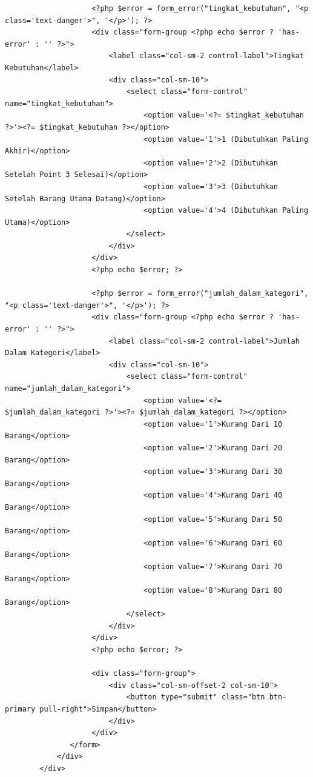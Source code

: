 \begin{enumerate}
\begin{enumerate}
\begin{lstlisting}
                    <?php $error = form_error("tingkat_kebutuhan", "<p class='text-danger'>", '</p>'); ?>
                    <div class="form-group <?php echo $error ? 'has-error' : '' ?>">
                        <label class="col-sm-2 control-label">Tingkat Kebutuhan</label>
                        <div class="col-sm-10">
                            <select class="form-control" name="tingkat_kebutuhan">
                                <option value='<?= $tingkat_kebutuhan ?>'><?= $tingkat_kebutuhan ?></option>
                                <option value='1'>1 (Dibutuhkan Paling Akhir)</option>
                                <option value='2'>2 (Dibutuhkan Setelah Point 3 Selesai)</option>
                                <option value='3'>3 (Dibutuhkan Setelah Barang Utama Datang)</option>
                                <option value='4'>4 (Dibutuhkan Paling Utama)</option>
                            </select>
                        </div>
                    </div>
                    <?php echo $error; ?>

                    <?php $error = form_error("jumlah_dalam_kategori", "<p class='text-danger'>", '</p>'); ?>
                    <div class="form-group <?php echo $error ? 'has-error' : '' ?>">
                        <label class="col-sm-2 control-label">Jumlah Dalam Kategori</label>
                        <div class="col-sm-10">
                            <select class="form-control" name="jumlah_dalam_kategori">
                                <option value='<?= $jumlah_dalam_kategori ?>'><?= $jumlah_dalam_kategori ?></option>
                                <option value='1'>Kurang Dari 10 Barang</option>
                                <option value='2'>Kurang Dari 20 Barang</option>
                                <option value='3'>Kurang Dari 30 Barang</option>
                                <option value='4'>Kurang Dari 40 Barang</option>
                                <option value='5'>Kurang Dari 50 Barang</option>
                                <option value='6'>Kurang Dari 60 Barang</option>
                                <option value='7'>Kurang Dari 70 Barang</option>
                                <option value='8'>Kurang Dari 80 Barang</option>
                            </select>
                        </div>
                    </div>
                    <?php echo $error; ?>

                    <div class="form-group">
                        <div class="col-sm-offset-2 col-sm-10">
                            <button type="submit" class="btn btn-primary pull-right">Simpan</button>
                        </div>
                    </div>
               </form>
            </div>
        </div>
        

\end{lstlisting}
\end{enumerate}
\end{enumerate}
